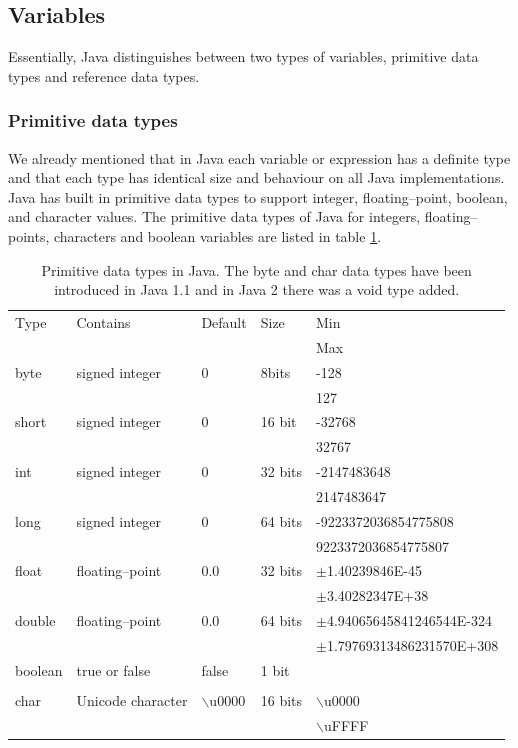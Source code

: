 \subsection{Variables}
\label{sec:Variables}

Essentially, Java distinguishes between two types of variables,
primitive data types and reference data types.
\subsubsection{Primitive data types}
\label{sec:primitive_data_types}
We already mentioned that in Java each variable or expression has a
definite type and that each type has identical size and behaviour on
all Java implementations.  Java has built in primitive data types
to support integer, floating--point, boolean, and character values.
The primitive data types of Java for integers, floating--points,
characters and boolean variables are listed in table
\ref{table:primitivedata}.
\begin{table}[htbp]
\label{table:primitivedata}
\begin{center}
\begin{tabular}{l|l|l|l|l}
Type & Contains & Default & Size & Min \\
     &          &         &      & Max \\ \hline \hline
byte  & signed integer & 0 & 8bits & -128  \\
&&& & 127    \\ \hline
short & signed integer & 0 & 16 bit &-32768 \\
&&& & 32767 \\ \hline
int &   signed integer & 0 & 32 bits&-2147483648 \\
&&& &2147483647 \\ \hline
long & signed integer & 0 & 64 bits &-9223372036854775808\\
&&& &9223372036854775807\\ \hline
float & floating--point & 0.0 & 32 bits &$\pm$1.40239846E-45\\
&&& &$\pm$3.40282347E+38\\ \hline
double & floating--point & 0.0 & 64 bits &$\pm$4.94065645841246544E-324\\
&&& &$\pm$1.79769313486231570E+308\\ \hline
boolean & true or false      &  false & 1 bit&\\
&&&       &  \\ \hline
char  & Unicode character & $\backslash$u0000 & 16 bits & $\backslash$u0000 \\
&&& &$\backslash$uFFFF   \\ \hline
\end{tabular}
\end{center}
\caption{Primitive data types in Java. The byte and char data types have
  been introduced in Java 1.1 and in Java 2 there was a void type added.}
\end{table}



